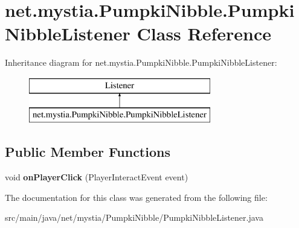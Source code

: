 \hypertarget{classnet_1_1mystia_1_1_pumpki_nibble_1_1_pumpki_nibble_listener}{\section{net.\-mystia.\-Pumpki\-Nibble.\-Pumpki\-Nibble\-Listener Class Reference}
\label{classnet_1_1mystia_1_1_pumpki_nibble_1_1_pumpki_nibble_listener}
}
Inheritance diagram for net.\-mystia.\-Pumpki\-Nibble.\-Pumpki\-Nibble\-Listener\-:\begin{figure}[H]
\begin{center}
\leavevmode
\includegraphics[height=2.000000cm]{classnet_1_1mystia_1_1_pumpki_nibble_1_1_pumpki_nibble_listener}
\end{center}
\end{figure}
\subsection*{Public Member Functions}
\begin{DoxyCompactItemize}
\item 
\hypertarget{classnet_1_1mystia_1_1_pumpki_nibble_1_1_pumpki_nibble_listener_ad3904862bb0646774ff82f8eea0da887}{void {\bfseries on\-Player\-Click} (Player\-Interact\-Event event)}\label{classnet_1_1mystia_1_1_pumpki_nibble_1_1_pumpki_nibble_listener_ad3904862bb0646774ff82f8eea0da887}

\end{DoxyCompactItemize}


The documentation for this class was generated from the following file\-:\begin{DoxyCompactItemize}
\item 
src/main/java/net/mystia/\-Pumpki\-Nibble/Pumpki\-Nibble\-Listener.\-java\end{DoxyCompactItemize}
